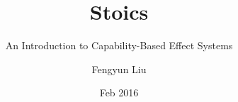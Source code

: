 \documentclass[aspectratio=169]{beamer}
\title{Stoics}
\subtitle{An Introduction to Capability-Based Effect Systems}
\author{Fengyun Liu}
\institute{School of Computer and Communication Sciences}
\date{Feb 2016}
\begin{document}
\begin{frame}
\titlepage
\end{frame}



\end{document}
